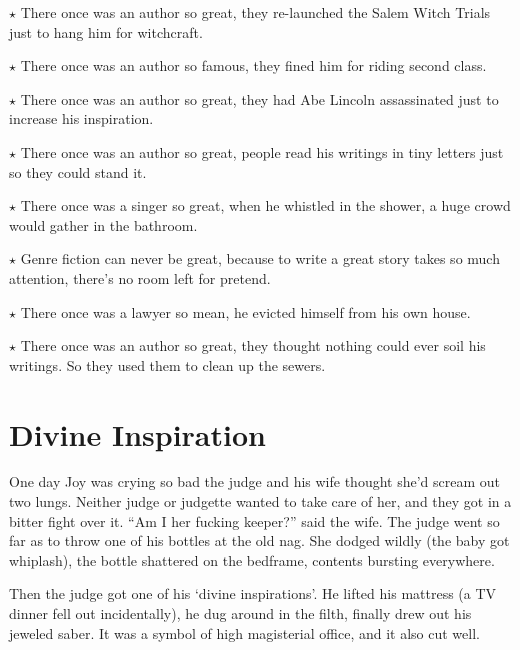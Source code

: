 \documentclass[oneside]{book}
\begin{document}
$\star$ There once was an author so great, they re-launched the Salem Witch Trials
just to hang him for witchcraft.

$\star$ There once was an author so famous, they fined him for riding second class.

$\star$ There once was an author so great, they had Abe Lincoln assassinated just to
increase his inspiration.

$\star$ There once was an author so great, people read his writings in tiny letters
just so they could stand it.

$\star$ There once was a singer so great, when he whistled in the shower, a huge
crowd would gather in the bathroom.

$\star$ Genre fiction can never be great, because to write a great story takes so much
attention, there's no room left for pretend.


$\star$ There once was a lawyer so mean, he evicted himself from his own house.



$\star$ There once was an author so great, they thought nothing could ever soil
his writings.  So they used them to clean up the sewers.


\chapter{Divine Inspiration}


One day Joy was crying so bad the judge and his wife thought she'd
scream out two lungs.
Neither judge or judgette wanted to take care of her, and they got in a
bitter fight over it.  ``Am I her fucking keeper?'' said the wife.
The judge went so far as to throw one of his bottles
at the old nag.  She dodged wildly (the baby got whiplash), the bottle shattered
on the bedframe, contents bursting everywhere.

Then the judge got one of his `divine inspirations'.
He lifted his mattress (a TV dinner fell out incidentally), he dug around
in the filth, finally drew out his jeweled saber.
It was a symbol of high magisterial office, and it also cut well.
\end{document}
